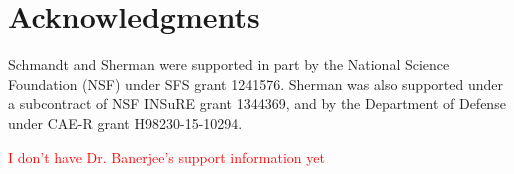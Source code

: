 \section{Acknowledgments}


Schmandt and Sherman were supported in part by the 
National Science Foundation (NSF) under SFS grant 1241576. 
Sherman was also supported under a subcontract of NSF INSuRE grant 1344369, 
and by the Department of Defense under CAE-R grant H98230-15-10294.

\textcolor{red}{I don't have Dr. Banerjee's support information yet}